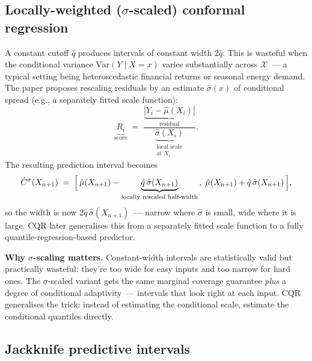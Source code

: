 \documentclass[letterpaper,11pt,leqno]{article}
\begin{document}
\subsection*{Locally-weighted ($\sigma$-scaled) conformal regression}

A constant cutoff $\hat{q}$ produces intervals of constant width $2\hat{q}$. This is wasteful when the conditional variance $\text{Var}(Y \mid X = x)$ varies substantially across $\mathcal{X}$~--- a typical setting being heteroscedastic financial returns or seasonal energy demand. The paper proposes rescaling residuals by an estimate $\hat{\sigma}(x)$ of conditional spread (e.g., a separately fitted scale function):
\begin{equation*}
\underbrace{R_i}_{\text{score}}
\;=\;
\frac{
\underbrace{|Y_i - \hat{\mu}(X_i)|}_{\text{residual}}
}{
\underbrace{\hat{\sigma}(X_i)}_{\substack{\text{local scale}\\\text{at } X_i}}
}.
\end{equation*}
The resulting prediction interval becomes
\begin{equation*}
\hat{C}^{\sigma}(X_{n+1})
\;=\;
\Bigl[\,
\hat{\mu}(X_{n+1}) - \underbrace{\hat{q}\,\hat{\sigma}(X_{n+1})}_{\text{locally rescaled half-width}}\,,\;
\hat{\mu}(X_{n+1}) + \hat{q}\,\hat{\sigma}(X_{n+1})
\,\Bigr],
\end{equation*}
so the width is now $2\hat{q}\,\hat{\sigma}(X_{n+1})$~--- narrow where $\hat{\sigma}$ is small, wide where it is large. CQR \cite{romano2019cqr} later generalises this from a separately fitted scale function to a fully quantile-regression-based predictor.

\begin{keyinsight}
\textbf{Why $\sigma$-scaling matters.} Constant-width intervals are statistically valid but practically wasteful: they're too wide for easy inputs and too narrow for hard ones. The $\sigma$-scaled variant gets the same marginal coverage guarantee \emph{plus} a degree of conditional adaptivity~--- intervals that look right at each input. CQR generalises the trick: instead of estimating the conditional scale, estimate the conditional quantiles directly.
\end{keyinsight}

\subsection*{Jackknife predictive intervals}
\end{document}
